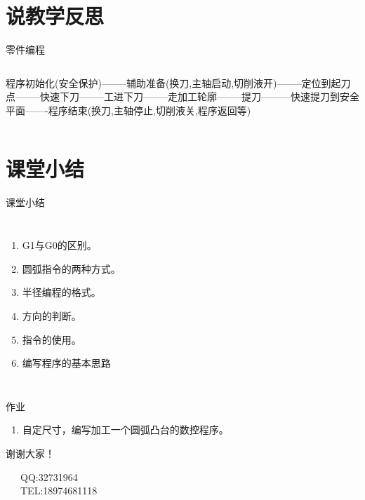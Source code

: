 \documentclass[UTF8,zihao=-4]{ctexbeamer}
\begin{document}
\section{说教学反思}
\begin{frame}{零件编程}
    \begin{columns}
        \column{\textwidth}
 程序初始化(安全保护)--------辅助准备(换刀,主轴启动,切削液开)--------定位到起刀点--------快速下刀--------工进下刀--------走加工轮廓--------提刀---------快速提刀到安全平面-------程序结束(换刀,主轴停止,切削液关,程序返回等)       
        
    \end{columns}
\end{frame}



\section*{课堂小结}
\begin{frame}{课堂小结}

    \begin{columns}
\begin{enumerate}[<+-> ]
\item G1与G0的区别。
\item 圆弧指令的两种方式。
\item 半径编程的格式。
\item 方向的判断。
\item 指令的使用。
\item 编写程序的基本思路
\end{enumerate}
    \end{columns}
\end{frame}

\begin{frame}{作业}
\begin{enumerate}
    \item 自定尺寸，编写加工一个圆弧凸台的数控程序。
\end{enumerate}
\end{frame}

\begin{frame}[plain]
\vfill

\centering \huge 谢谢大家！

\vfill

\flushleft \footnotesize   
~~~QQ:32731964\\
~~~TEL:18974681118\\

\end{frame}
\end{document}
